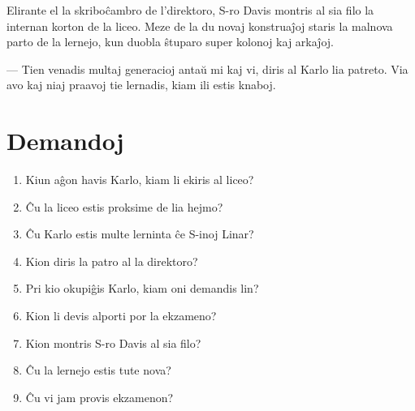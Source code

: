 Elirante el la skriboĉambro de l'direktoro, S-ro Davis montris al sia filo la internan korton de la liceo. Meze de la du novaj konstruaĵoj staris la malnova parto de la lernejo, kun duobla ŝtuparo super kolonoj kaj arkaĵoj.

— Tien venadis multaj generacioj antaŭ mi kaj vi, diris al Karlo lia patreto. Via avo kaj niaj praavoj tie lernadis, kiam ili estis knaboj.

\newpage

\section*{Demandoj}

\begin{enumerate}
    \item  Kiun aĝon havis Karlo, kiam li ekiris al liceo?
    \item  Ĉu la liceo estis proksime de lia hejmo?
    \item  Ĉu Karlo estis multe lerninta ĉe S-inoj Linar?
    \item  Kion diris la patro al la direktoro?
    \item  Pri kio okupiĝis Karlo, kiam oni demandis lin?
    \item  Kion li devis alporti por la ekzameno?
    \item  Kion montris S-ro Davis al sia filo?
    \item  Ĉu la lernejo estis tute nova?
    \item  Ĉu vi jam provis ekzamenon?
\end{enumerate}
